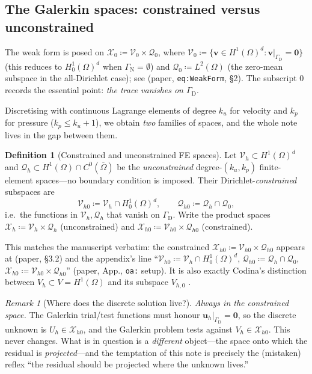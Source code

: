 \documentclass[11pt]{article}
\newcommand{\bu}{\boldsymbol{u}}
\newcommand{\bv}{\boldsymbol{v}}
\newcommand{\bzero}{\boldsymbol{0}}
\newcommand{\Xzero}{\mathcal{X}_{0}}
\newcommand{\Xh}{\mathcal{X}_{h}}
\newcommand{\Xhz}{\mathcal{X}_{h0}}
\newcommand{\Vzero}{\mathcal{V}_{0}}
\newcommand{\Vh}{\mathcal{V}_{h}}
\newcommand{\Vhz}{\mathcal{V}_{h0}}
\newcommand{\Qzero}{\mathcal{Q}_{0}}
\newcommand{\Qh}{\mathcal{Q}_{h}}
\newcommand{\Qhz}{\mathcal{Q}_{h0}}
\newcommand{\Uh}{U_{h}}
\theoremstyle{plain}
\theoremstyle{definition}
\newtheorem{definition}{Definition}
\theoremstyle{remark}
\newtheorem*{remark}{Remark}
\begin{document}
\subsection{The Galerkin spaces: constrained versus unconstrained}

The weak form is posed on
$\Xzero\coloneqq\Vzero\times\Qzero$, where
$\Vzero\coloneqq\{\bv\in H^1(\Omega)^d:\bv|_{\Gamma_{\mathrm D}}=\bzero\}$
(this reduces to $H^1_0(\Omega)^d$ when
$\Gamma_{\mathrm N}=\emptyset$) and $\Qzero\coloneqq L^2(\Omega)$
(the zero-mean subspace in the all-Dirichlet case); see (paper,
\texttt{eq:WeakForm}, \S2). The subscript $0$ records the essential
point: \emph{the trace vanishes on $\Gamma_{\mathrm D}$}.

Discretising with continuous Lagrange elements of degree $k_u$ for
velocity and $k_p$ for pressure ($k_p\le k_u+1$), we obtain \emph{two}
families of spaces, and the whole note lives in the gap between them.

\begin{definition}[Constrained and unconstrained FE spaces]
\label{def:spaces}
Let $\Vh\subset H^1(\Omega)^d$ and $\Qh\subset H^1(\Omega)\cap
C^0(\overline\Omega)$ be the \emph{unconstrained} degree-$(k_u,k_p)$
finite-element spaces---no boundary condition is imposed. Their
Dirichlet-\emph{constrained} subspaces are
\[
  \Vhz\coloneqq\Vh\cap H^1_0(\Omega)^d,
  \qquad
  \Qhz\coloneqq\Qh\cap\Qzero,
\]
i.e.\ the functions in $\Vh,\Qh$ that vanish on $\Gamma_{\mathrm D}$.
Write the product spaces
$\Xh\coloneqq\Vh\times\Qh$ (unconstrained) and
$\Xhz\coloneqq\Vhz\times\Qhz$ (constrained).
\end{definition}

This matches the manuscript verbatim: the constrained
$\Xhz\coloneqq\Vhz\times\Qhz$ appears at (paper, \S3.2) and the
appendix's line
``$\Vhz\coloneqq\Vh\cap H^1_0(\Omega)^d$, $\Qhz\coloneqq\Qh\cap\Qzero$,
$\Xhz\coloneqq\Vhz\times\Qhz$'' (paper, App.,
\texttt{oa:} setup). It is also exactly Codina's distinction between
$V_h\subset V=H^1(\Omega)$ and its subspace $V_{h,0}$ \cite{codina2008}.

\begin{remark}[Where does the discrete solution live?]
\emph{Always in the constrained space.} The Galerkin trial/test
functions must honour $\bu_h|_{\Gamma_{\mathrm D}}=\bzero$, so the
discrete unknown is $\Uh\in\Xhz$, and the Galerkin problem tests against
$V_h\in\Xhz$. This never changes. What is in question is a
\emph{different} object---the space onto which the residual is
\emph{projected}---and the temptation of this note is precisely the
(mistaken) reflex ``the residual should be projected where the unknown
lives.''
\end{remark}
\end{document}
